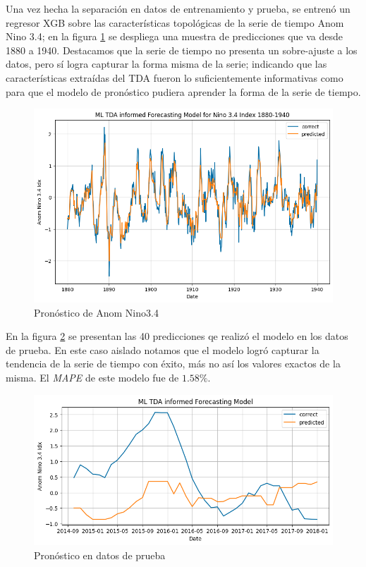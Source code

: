 \documentclass{article}
\begin{document}
            Una vez hecha la separación en datos de entrenamiento y prueba, se entrenó un regresor XGB sobre las características topológicas de la serie de tiempo Anom Nino 3.4; en la figura \ref{fig:anom_nino34_forecast} se despliega una muestra de predicciones que va desde 1880 a 1940. Destacamos que la serie de tiempo no presenta un sobre-ajuste a los datos, pero sí logra capturar la forma misma de la serie; indicando que las características extraídas del TDA fueron lo suficientemente informativas como para que el modelo de pronóstico pudiera aprender la forma de la serie de tiempo.
            \begin{figure}[!htbp]
                \centering
                \includegraphics[scale=0.5]{forecasting_ml_xgb.png}
                \caption{Pronóstico de Anom Nino3.4}
                \label{fig:anom_nino34_forecast}
            \end{figure}

            En la figura \ref{fig:anom_nino34_forecast_test} se presentan las 40 predicciones qe realizó el modelo en los datos de prueba. En este caso aislado notamos que el modelo logró capturar la tendencia de la serie de tiempo con éxito, más no así los valores exactos de la misma. El \textit{MAPE} de este modelo fue de $1.58\%$.
            \begin{figure}[!htbp]
                \centering
                \includegraphics[scale=0.5]{forecasting_ml_xgb_test.png}
                \caption{Pronóstico en datos de prueba}
                \label{fig:anom_nino34_forecast_test}
            \end{figure}
\end{document}

